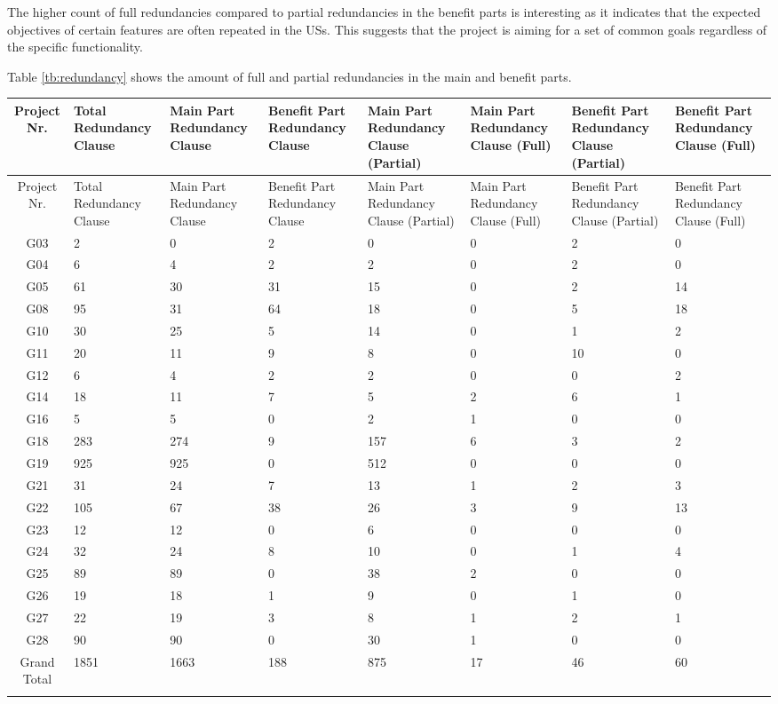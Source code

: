 The higher count of full redundancies compared to partial redundancies in the benefit parts is interesting as it indicates that the expected objectives of certain features are often repeated in the USs. This suggests that the project is aiming for a set of common goals regardless of the specific functionality.

Table \ref{tb:redundancy} shows the amount of full and partial redundancies in the main and benefit parts.

\begingroup
\centering
\scriptsize
\renewcommand{\arraystretch}{1.5}
\begin{tabularx}{\linewidth}{cXXXXXXX}
	\hline
	Project Nr. & Total Redundancy Clause & Main Part Redundancy Clause & Benefit Part Redundancy Clause & Main Part Redundancy Clause (Partial) & Main Part Redundancy Clause (Full) & Benefit Part Redundancy Clause (Partial) & Benefit Part Redundancy Clause (Full) \\
	\hline
	\hline
	\endfirsthead
	\hline
	Project Nr. & Total Redundancy Clause & Main Part Redundancy Clause & Benefit Part Redundancy Clause & Main Part Redundancy Clause (Partial) & Main Part Redundancy Clause (Full) & Benefit Part Redundancy Clause (Partial) & Benefit Part Redundancy Clause (Full) \\
	\hline
	\hline
	\endhead
	G03 & 2 & 0 & 2 & 0&0 & 2 & 0\\
	\hline
	G04 & 6 & 4 & 2 & 2 &0 & 2 &0 \\
	\hline
	G05 & 61 & 30 & 31 & 15 &0 & 2&14  \\
	\hline
	G08 & 95 & 31 & 64 & 18 &0 & 5&18  \\
	\hline
	G10 & 30 & 25 & 5 & 14 &0 & 1 & 2 \\
	\hline
	G11 & 20 & 11 & 9 & 8 &0 & 10 &0 \\
	\hline
	G12 & 6 & 4 & 2 & 2 &0 &0 & 2 \\
	\hline
	G14 & 18 & 11 & 7 & 5 & 2 & 6 & 1 \\
	\hline
	G16 & 5 & 5 & 0 & 2 & 1 &0 &0 \\
	\hline
	G18 & 283 & 274 & 9 & 157 & 6 & 3 & 2 \\
	\hline
	G19 & 925 & 925 & 0 & 512 & 0&0 &0 \\
	\hline
	G21 & 31 & 24 & 7 & 13 & 1 & 2 & 3 \\
	\hline
	G22 & 105 & 67 & 38 & 26 & 3 & 9 & 13 \\
	\hline
	G23 & 12 & 12 & 0 & 6 &0 &0 &0 \\
	\hline
	G24 & 32 & 24 & 8 & 10 & 0& 1 & 4 \\
	\hline
	G25 & 89 & 89 & 0 & 38 & 2 &0 &0 \\
	\hline
	G26 & 19 & 18 & 1 & 9 &0 & 1 &0 \\
	\hline
	G27 & 22 & 19 & 3 & 8 & 1 & 2 & 1 \\
	\hline
	G28 & 90 & 90 & 0 & 30 & 1 & 0&0 \\
	\hline
	\hline
	Grand Total & 1851 & 1663 & 188 & 875 & 17 & 46 & 60 \\
	\hline
	\hline
	\caption{Detail about full and partial redundancies related to main or benefit parts}\label{tb:redundancy}
\end{tabularx}

